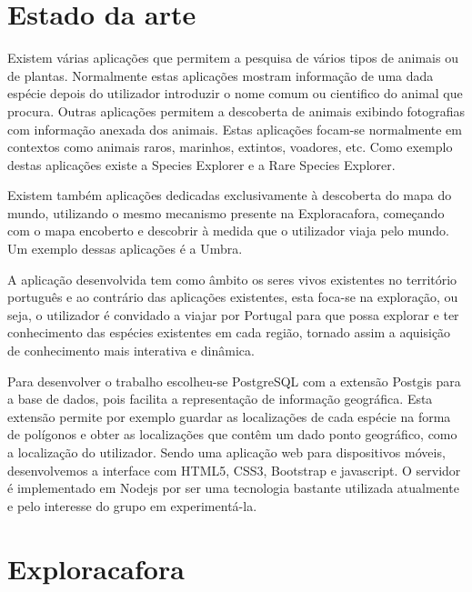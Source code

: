\documentclass[twocolumn,twoside,11pt,a4paper]{article}
\begin{document}

\section{Estado da arte}\label{sec:sota}

Existem várias aplicações que permitem a pesquisa de vários tipos de animais ou de plantas. Normalmente estas aplicações mostram informação de uma dada espécie depois do utilizador introduzir o nome comum ou cientifico do animal que procura. Outras aplicações permitem a descoberta de animais exibindo fotografias com informação anexada dos animais. Estas aplicações focam-se normalmente em contextos como animais raros, marinhos, extintos, voadores, etc. Como exemplo destas aplicações existe a Species Explorer e a Rare Species Explorer.

Existem também aplicações dedicadas exclusivamente à descoberta do mapa do mundo, utilizando o mesmo mecanismo presente na Exploracafora, começando com o mapa encoberto e descobrir à medida que o utilizador viaja pelo mundo. Um exemplo dessas aplicações é a Umbra.

A aplicação desenvolvida tem como âmbito os seres vivos existentes no território português e ao contrário das aplicações existentes, esta foca-se na exploração, ou seja, o utilizador é convidado a viajar por Portugal para que possa explorar e ter conhecimento das espécies existentes em cada região, tornado assim a aquisição de conhecimento mais interativa e dinâmica.

Para desenvolver o trabalho escolheu-se PostgreSQL com a extensão Postgis para a base de dados, pois facilita a representação de informação geográfica. Esta extensão permite por exemplo guardar as localizações de cada espécie na forma de polígonos e obter as localizações que contêm um dado ponto geográfico, como a localização do utilizador. Sendo uma aplicação web para dispositivos móveis, desenvolvemos a interface com HTML5, CSS3, Bootstrap e javascript. O servidor é implementado em Nodejs por ser uma tecnologia bastante utilizada atualmente e pelo interesse do grupo em experimentá-la.


\section{Exploracafora}\label{sec:application}
\end{document}
